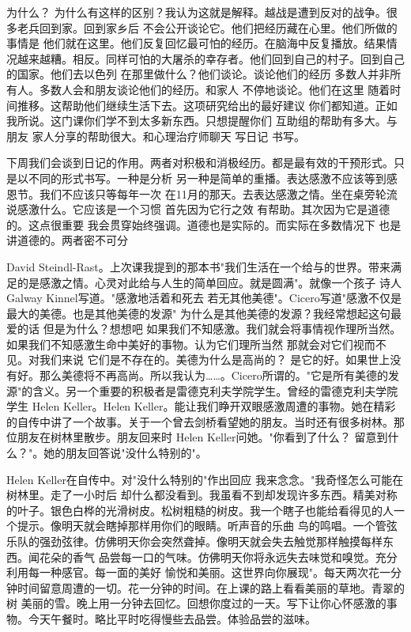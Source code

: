 为什么？ 为什么有这样的区别？我认为这就是解释。越战是遭到反对的战争。很多老兵回到家。回到家乡后 不会公开谈论它。他们把经历藏在心里。他们所做的事情是 他们就在这里。他们反复回忆最可怕的经历。在脑海中反复播放。结果情况越来越糟。相反。同样可怕的大屠杀的幸存者。他们回到自己的村子。回到自己的国家。他们去以色列 在那里做什么？他们谈论。谈论他们的经历 多数人并非所有人。多数人会和朋友谈论他们的经历。和家人 不停地谈论。他们在这里 随着时间推移。这帮助他们继续生活下去。这项研究给出的最好建议 你们都知道。正如我所说。这门课你们学不到太多新东西。只想提醒你们 互助组的帮助有多大。与朋友 家人分享的帮助很大。和心理治疗师聊天 写日记 书写。 

下周我们会谈到日记的作用。两者对积极和消极经历。都是最有效的干预形式。只是以不同的形式书写。一种是分析 另一种是简单的重播。表达感激不应该等到感恩节。我们不应该只等每年一次 在11月的那天。去表达感激之情。坐在桌旁轮流说感激什么。它应该是一个习惯 首先因为它行之效 有帮助。其次因为它是道德的。这点很重要 我会贯穿始终强调。道德也是实际的。而实际在多数情况下 也是讲道德的。两者密不可分 

David Steindl-Rast。上次课我提到的那本书"我们生活在一个给与的世界。带来满足的是感激之情。心灵对此给与人生的简单回应。就是圆满"。就像一个孩子 诗人Galway Kinnel写道。"感激地活着和死去 若无其他美德"。Cicero写道"感激不仅是最大的美德。也是其他美德的发源" 为什么是其他美德的发源？我经常想起这句最爱的话 但是为什么？想想吧 如果我们不知感激。我们就会将事情视作理所当然。如果我们不知感激生命中美好的事物。认为它们理所当然 那就会对它们视而不见。对我们来说 它们是不存在的。美德为什么是高尚的？ 是它的好。如果世上没有好。那么美德将不再高尚。所以我认为……。Cicero所谓的。"它是所有美德的发源"的含义。另一个重要的积极者是雷德克利夫学院学生。曾经的雷德克利夫学院学生 Helen Keller。Helen Keller。能让我们睁开双眼感激周遭的事物。她在精彩的自传中讲了一个故事。关于一个曾去剑桥看望她的朋友。当时还有很多树林。那位朋友在树林里散步。朋友回来时 Helen Keller问她。"你看到了什么？ 留意到什么？"。她的朋友回答说"没什么特别的"。 

Helen Keller在自传中。对"没什么特别的"作出回应 我来念念。"我奇怪怎么可能在树林里。走了一小时后 却什么都没看到。我虽看不到却发现许多东西。精美对称的叶子。银色白桦的光滑树皮。松树粗糙的树皮。我一个瞎子也能给看得见的人一个提示。像明天就会瞎掉那样用你们的眼睛。听声音的乐曲 鸟的鸣唱。一个管弦乐队的强劲弦律。仿佛明天你会突然聋掉。像明天就会失去触觉那样触摸每样东西。闻花朵的香气 品尝每一口的气味。仿佛明天你将永远失去味觉和嗅觉。充分利用每一种感官。每一面的美好 愉悦和美丽。这世界向你展现"。每天两次花一分钟时间留意周遭的一切。花一分钟的时间。在上课的路上看看美丽的草地。青翠的树 美丽的雪。晚上用一分钟去回忆。回想你度过的一天。写下让你心怀感激的事物。今天午餐时。略比平时吃得慢些去品尝。体验品尝的滋味。 

